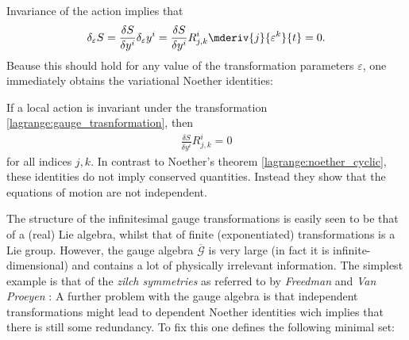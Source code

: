    Invariance of the action implies that
    \begin{gather}
        \delta_\varepsilon S = \frac{\delta S}{\delta y^i}\delta_\varepsilon y^i = \frac{\delta S}{\delta y^i}R^i_{j,k}\mderiv{j}{\varepsilon^k}{t} = 0.
    \end{gather}
    Beause this should hold for any value of the transformation parameters $\varepsilon$, one immediately obtains the variational Noether identities:
    \begin{property}
        If a local action is invariant under the transformation \ref{lagrange:gauge_trasnformation}, then
        \begin{gather}
            \frac{\delta S}{\delta y^i}R^i_{j,k} = 0
        \end{gather}
        for all indices $j,k$. In contrast to Noether's theorem \ref{lagrange:noether_cyclic}, these identities do not imply conserved quantities. Instead they show that the equations of motion are not independent.
    \end{property}
    The structure of the infinitesimal gauge transformations is easily seen to be that of a (real) Lie algebra, whilst that of finite (exponentiated) transformations is a Lie group. However, the gauge algebra $\overline{\mathcal{G}}$ is very large (in fact it is infinite-dimensional) and contains a lot of physically irrelevant information. The simplest example is that of the \textit{zilch symmetries} as referred to by \textit{Freedman} and \textit{Van Proeyen} \cite{supergravity}:
    A further problem with the gauge algebra is that independent transformations might lead to dependent Noether identities wich implies that there is still some redundancy. To fix this one defines the following minimal set:
